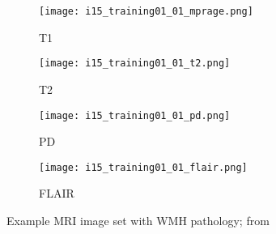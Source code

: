 \begin{figure}
  \centering
  \begin{subfigure}{0.24\textwidth}\texttt{[image: i15\_training01\_01\_mprage.png]}\caption{T1}  \label{fig:4mriT1}\end{subfigure}
  \begin{subfigure}{0.24\textwidth}\texttt{[image: i15\_training01\_01\_t2.png]}\caption{T2}      \label{fig:4mriT2}\end{subfigure}
  \begin{subfigure}{0.24\textwidth}\texttt{[image: i15\_training01\_01\_pd.png]}\caption{PD}      \label{fig:4mriPD}\end{subfigure}
  \begin{subfigure}{0.24\textwidth}\texttt{[image: i15\_training01\_01\_flair.png]}\caption{FLAIR}\label{fig:4mriIR}\end{subfigure}
  \caption{Example MRI image set with WMH pathology; from \cite{WMHSEG2017}}
  \label{fig:4mri}
\end{figure}
